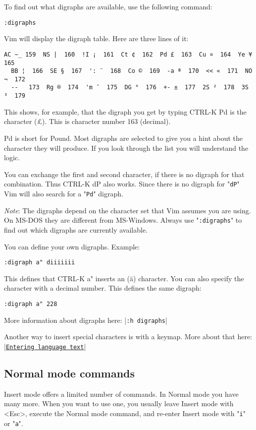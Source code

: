 To find out what digraphs are available, use the following command:

\begin{Verbatim}[samepage=true]
 :digraphs
\end{Verbatim}

Vim will display the digraph table.
Here are three lines of it:

\begin{Verbatim}[samepage=true]
  AC ~_ 159  NS |  160  !I ¡  161  Ct ¢  162  Pd £  163  Cu ¤  164  Ye ¥  165
  BB ¦  166  SE §  167  ': ¨  168  Co ©  169  -a ª  170  << «  171  NO ¬  172
  -- ­  173  Rg ®  174  'm ¯  175  DG °  176  +- ±  177  2S ²  178  3S ³  179 
\end{Verbatim}
 
This shows, for example, that the digraph you get by typing CTRL-K Pd is the character (£).
This is character number 163 (decimal).

Pd is short for Pound.
Most digraphs are selected to give you a hint about the character they will produce.
If you look through the list you will understand the logic.

You can exchange the first and second character, if there is no digraph for that combination.
Thus CTRL-K dP also works.
Since there is no digraph for "\verb!dP!" Vim will also search for a "\verb!Pd!" digraph.

\emph{Note}: The digraphs depend on the character set that Vim assumes you are using.
On MS-DOS they are different from MS-Windows.
Always use "\verb!:digraphs!" to find out which digraphs are currently available.

You can define your own digraphs.  Example:

\begin{Verbatim}[samepage=true]
 :digraph a" diiiiiii
\end{Verbatim}

This defines that CTRL-K a" inserts an (ä) character.
You can also specify the character with a decimal number.
This defines the same digraph:

\begin{Verbatim}[samepage=true]
 :digraph a" 228
\end{Verbatim}

More information about digraphs here: |\verb!:h digraphs!|

Another way to insert special characters is with a keymap.
More about that here: |\hyperref[Entering language text]{\texttt{Entering language text}}|
\subsection{Normal mode commands}
Insert mode offers a limited number of commands.
In Normal mode you have many more.
When you want to use one, you usually leave Insert mode with <Esc>, execute the Normal mode command, and re-enter Insert mode with "\verb!i!" or "\verb!a!".

